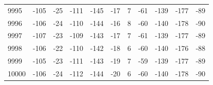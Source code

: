 \begin{table}[H]
\begin{tabular}{lllllllllll}
9995 & -105 & -25 & -111 & -145 & -17 & 7 & -61 & -139 & -177 & -89 \\
9996 & -106 & -24 & -110 & -144 & -16 & 8 & -60 & -140 & -178 & -90 \\
9997 & -107 & -23 & -109 & -143 & -17 & 7 & -61 & -139 & -177 & -89 \\
9998 & -106 & -22 & -110 & -142 & -18 & 6 & -60 & -140 & -176 & -88 \\
9999 & -105 & -23 & -111 & -143 & -19 & 7 & -59 & -139 & -177 & -89 \\
10000 & -106 & -24 & -112 & -144 & -20 & 6 & -60 & -140 & -178 & -90 \\
\bottomrule
\end{tabular}

\end{table}
